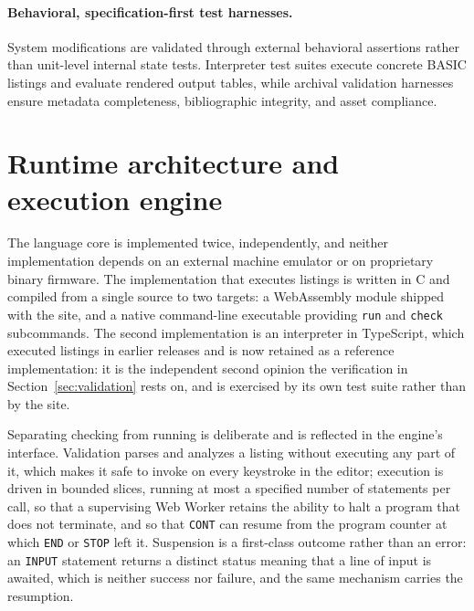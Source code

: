 \documentclass[11pt,a4paper]{article}
\begin{document}
\paragraph{Behavioral, specification-first test harnesses.} System modifications are validated through external behavioral assertions rather than unit-level internal state tests. Interpreter test suites execute concrete BASIC listings and evaluate rendered output tables, while archival validation harnesses ensure metadata completeness, bibliographic integrity, and asset compliance.

\section{Runtime architecture and execution engine}
\label{sec:implementation}

The language core is implemented twice, independently, and neither implementation depends on an external machine emulator or on proprietary binary firmware. The implementation that executes listings is written in C and compiled from a single source to two targets: a WebAssembly module shipped with the site, and a native command-line executable providing \texttt{run} and \texttt{check} subcommands. The second implementation is an interpreter in TypeScript, which executed listings in earlier releases and is now retained as a reference implementation: it is the independent second opinion the verification in Section~\ref{sec:validation} rests on, and is exercised by its own test suite rather than by the site.

Separating checking from running is deliberate and is reflected in the engine's interface. Validation parses and analyzes a listing without executing any part of it, which makes it safe to invoke on every keystroke in the editor; execution is driven in bounded slices, running at most a specified number of statements per call, so that a supervising Web Worker retains the ability to halt a program that does not terminate, and so that \texttt{CONT} can resume from the program counter at which \texttt{END} or \texttt{STOP} left it. Suspension is a first-class outcome rather than an error: an \texttt{INPUT} statement returns a distinct status meaning that a line of input is awaited, which is neither success nor failure, and the same mechanism carries the resumption.
\end{document}
